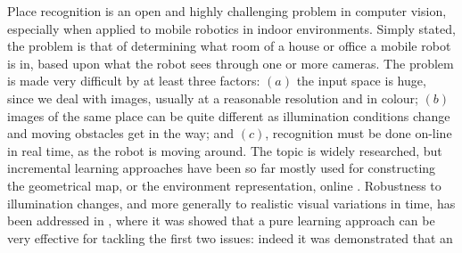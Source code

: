 Place recognition is an open and highly challenging problem in
computer vision, especially when applied to mobile robotics in indoor
environments. Simply stated, the problem is that of determining what
room of a house or office a mobile robot is in, based upon what the
robot sees through one or more cameras. The problem is made very
difficult by at least three factors: $(a)$ the input space is huge,
since we deal with images, usually at a reasonable resolution and in
colour; $(b)$ images of the same place can be quite different as
illumination conditions change and moving obstacles get in the way;
and $(c)$, recognition must be done on-line in real time, as the robot
is moving around. The topic is widely researched, but incremental
learning approaches have been so far mostly used for constructing the
geometrical map, or the environment representation,
online \cite{emma:irca05, ljubjiana:icra02}. Robustness to illumination
changes, and more generally to realistic visual variations in time,
has been addressed in \cite{pronobis:iros06}, where it was showed that
a pure learning approach can be very effective
for tackling the first two issues: indeed it was demonstrated that an
